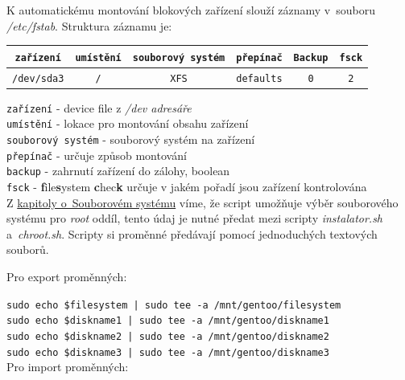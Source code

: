 \documentclass[12pt,a4paper,twoside,]{article}
\begin{document}
{{{{{{K automatickému montování blokových zařízení slouží záznamy v~souboru \textit{/etc/fstab}. Struktura záznamu je:

\begin{table}[h]
	\begin{tabular}{|c|c|c|c|c|c|}
		\hline
		\texttt{zařízení} & \texttt{umístění} & \texttt{souborový systém} & \texttt{přepínač} & \texttt{Backup} & \texttt{fsck} \\
		\hline
		\texttt{/dev/sda3} & \texttt{/} & \texttt{XFS} & \texttt{defaults} & \texttt{0} & \texttt{2} \\
		\hline
		
	\end{tabular}
\end{table}
\hspace*{-1.5em}\texttt{zařízení} - device file z \textit{/dev adresáře}\\
\texttt{umístění} - lokace pro montování obsahu zařízení \\
\texttt{souborový systém} - souborový systém na zařízení\\
\texttt{přepínač} - určuje způsob montování\\
\texttt{backup} - zahrnutí zařízení do zálohy, boolean\\
\texttt{fsck} - {\bf f}ile{\bf s}ystem {\bf c}hec{\bf k} určuje v jakém pořadí jsou zařízení kontrolována\\

Z \hyperlink{Souborový systém}{kapitoly o~Souborovém systému} víme, že script umožňuje výběr souborového systému pro \textit{root} oddíl, tento údaj je nutné předat mezi scripty \textit{instalator.sh} a~\textit{chroot.sh}. Scripty si proměnné předávají pomocí jednoduchých textových souborů.

\hspace*{-1.5em}Pro export proměnných:

\texttt{sudo echo \$filesystem | sudo tee -a /mnt/gentoo/filesystem} \\
\hspace*{1.5em}\texttt{sudo echo \$diskname1 | sudo tee -a /mnt/gentoo/diskname1} \\
\hspace*{1.5em}\texttt{sudo echo \$diskname2 | sudo tee -a /mnt/gentoo/diskname2} \\
\hspace*{1.5em}\texttt{sudo echo \$diskname3 | sudo tee -a /mnt/gentoo/diskname3} \\

\hspace*{-1.5em}Pro import proměnných:

}}}}}}
\end{document}
